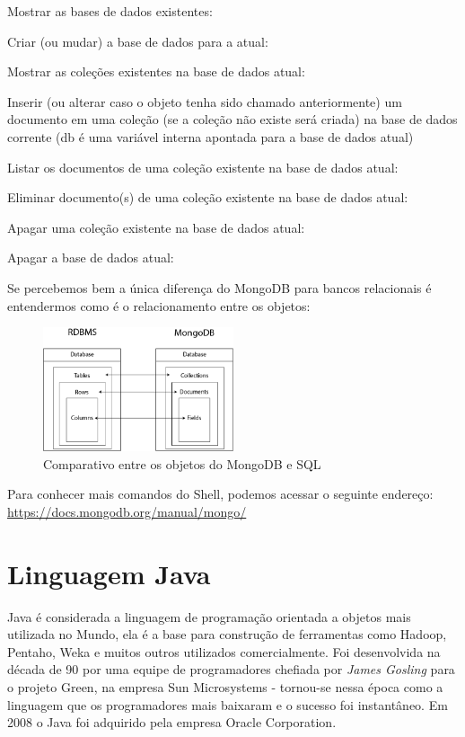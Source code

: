 \documentclass[a4paper,11pt]{article}
\begin{document}
Mostrar as bases de dados existentes: \\

Criar (ou mudar) a base de dados para a atual: \\

Mostrar as coleções existentes na base de dados atual: \\

Inserir (ou alterar caso o objeto tenha sido chamado anteriormente) um documento em uma coleção (se a coleção não existe será criada) na base de dados corrente (db é uma variável interna apontada para a base de dados atual) \\

Listar os documentos de uma coleção existente na base de dados atual: \\

Eliminar documento(s) de uma coleção existente na base de dados atual: \\

Apagar uma coleção existente na base de dados atual: \\

Apagar a base de dados atual: \\

Se percebemos bem a única diferença do MongoDB para bancos relacionais é entendermos como é o relacionamento entre os objetos:
\begin{figure}[H]
	\centering
	\includegraphics[width=0.5\textwidth]{imagens/comparativo.png}
	\caption{Comparativo entre os objetos do MongoDB e SQL}
\end{figure}

Para conhecer mais comandos do Shell, podemos acessar o seguinte endereço:  \url{https://docs.mongodb.org/manual/mongo/}

\section{Linguagem Java}
Java é considerada a linguagem de programação orientada a objetos mais utilizada no Mundo, ela é a base para construção de ferramentas como Hadoop, Pentaho, Weka e muitos outros utilizados comercialmente. Foi desenvolvida na década de 90 por uma equipe de programadores chefiada por \textit{James Gosling} para o projeto Green, na empresa Sun Microsystems - tornou-se nessa época como a linguagem que os programadores mais baixaram e o sucesso foi instantâneo. Em 2008 o Java foi adquirido pela empresa Oracle Corporation.
\end{document}
